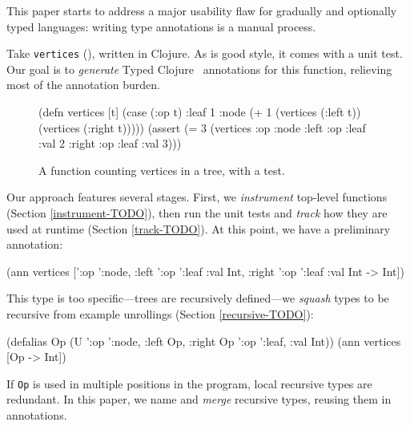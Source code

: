 

This paper starts to address a major usability flaw
for gradually and optionally typed languages:
writing type annotations is a manual process.

Take \texttt{vertices} (),
written in Clojure.
As is good style, it comes with a unit test.
Our goal is to \textit{generate} Typed Clojure~\cite{bonnaire2016practical}
annotations
for this function, relieving most of the annotation
burden.

\begin{figure}
\begin{cljlisting}
(defn vertices [t]
  (case (:op t)
    :leaf 1
    :node (+ 1 (vertices (:left t))
               (vertices (:right t)))))
(assert (= 3 (vertices
               {:op :node 
                :left {:op :leaf :val 2}
                :right {:op :leaf :val 3}})))
\end{cljlisting}
\caption{A function counting vertices in a tree, with a test.}
\label{infer:fig:vertices}
\end{figure}

Our approach features several stages.
First, we \textit{instrument} top-level functions
(Section \ref{instrument-TODO}),
then run the unit tests and \textit{track}
how they are used at runtime
(Section \ref{track-TODO}).
At this point, we have a preliminary
annotation:

\begin{cljlisting}
(ann vertices ['{:op ':node,
                 :left '{:op ':leaf :val Int},
                 :right '{:op ':leaf :val Int}}
               -> Int])
\end{cljlisting}

This type is too specific---trees are recursively
defined---we \textit{squash} types to be
recursive from example unrollings (Section \ref{recursive-TODO}):

\begin{cljlisting}
(defalias Op 
  (U '{:op ':node, :left Op, :right Op}
     '{:op ':leaf, :val Int}))
(ann vertices [Op -> Int])
\end{cljlisting}

%
If \texttt{Op} is used in multiple positions
in the program, local recursive types are redundant.
In this paper, we name and \textit{merge} recursive
types, reusing them in annotations.
 
